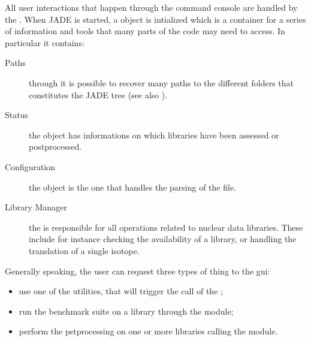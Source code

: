 \documentclass[letterpaper,10pt,english]{sphinxmanual}
\begin{document}
All user interactions that happen through the command console are handled
by the . When JADE is started, a {\hyperref[\detokenize{api/initobjects:sessionob}]{}} object
is intialized which is a container for a series of information and tools
that many parts of the code may need to access. In particular it contains:
\begin{description}
\item[{Paths}] \leavevmode
through {\hyperref[\detokenize{api/initobjects:sessionob}]{}} it is possible to recover many paths to the
different folders that constitutes the JADE tree (see also {\hyperref[\detokenize{usage/folders:folders}]{}}).

\item[{Status}] \leavevmode
the {\hyperref[\detokenize{api/initobjects:statusob}]{}} object has informations on which libraries have
been assessed or post\sphinxhyphen{}processed.

\item[{Configuration}] \leavevmode
the {\hyperref[\detokenize{api/initobjects:confob}]{}} object is the one that handles the
parsing of the {\hyperref[\detokenize{usage/configuration:mainconfig}]{}} file.

\item[{Library Manager}] \leavevmode
the {\hyperref[\detokenize{api/initobjects:libmanagerob}]{}} is responsible for all operations related
to nuclear data libraries. These include for instance checking the
availability of a library, or handling the translation of a single isotope.

\end{description}

Generally speaking, the user can request three types of thing to the gui:
\begin{itemize}
\item {} 
use one of the utilities, that will trigger the call of the ;

\item {} 
run the benchmark suite on a library through the  module;

\item {} 
perform the pst\sphinxhyphen{}processing on one or more libraries calling the 
module.

\end{itemize}
\end{document}
